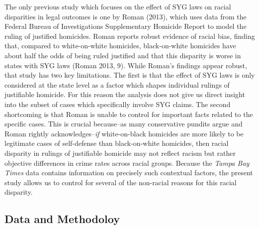 \documentclass[12pt,article]{article}
\begin{document}
The only previous study which focuses on the effect of SYG laws on
racial disparities in legal outcomes is one by Roman (2013), which uses
data from the Federal Bureau of Investigations Supplementary Homicide
Report to model the ruling of justified homicides. Roman reports robust
evidence of racial bias, finding that, compared to white-on-white
homicides, black-on-white homicides have about half the odds of being
ruled justified and that this disparity is worse in states with SYG laws
(Roman 2013, 9). While Roman's findings appear robust, that study has
two key limitations. The first is that the effect of SYG laws is only
considered at the state level as a factor which shapes individual
rulings of justifiable homicide. For this reason the analysis does not
give us direct insight into the subset of cases which specifically
involve SYG claims. The second shortcoming is that Roman is unable to
control for important facts related to the specific cases. This is
crucial because--as many conservative pundits argue and Roman rightly
acknowledges--\emph{if} white-on-black homicides are more likely to be
legitimate cases of self-defense than black-on-white homicides, then
racial disparity in rulings of justifiable homicide may not reflect
racism but rather objective differences in crime rates across racial
groups. Because the \emph{Tampa Bay Times} data contains information on
precisely such contextual factors, the present study allows us to
control for several of the non-racial reasons for this racial disparity.

\subsection{Data and Methodoloy}\label{data-and-methodoloy}
\end{document}
